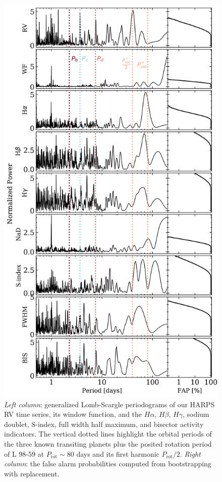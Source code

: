 \documentclass[longauth]{aa}
\begin{document}
\begin{figure}
    \centering
    \includegraphics[width=0.98\hsize]{periodograms.png}
    \caption{\emph{Left column}: generalized Lomb-Scargle periodograms of our HARPS RV time series, its window function, and the $H\alpha$, $H\beta$, $H\gamma$, sodium doublet, S-index, full width half maximum, and bisector activity indicators. The vertical dotted lines highlight the orbital periods of the three known transiting planets plus the posited rotation period of L 98-59 at $P_{\text{rot}} \sim 80$ days and its first harmonic $P_{\text{rot}}/2$. \emph{Right column}: the false alarm probabilities computed from bootstrapping with replacement.}
    \label{fig:GLSP}
\end{figure}
\end{document}
